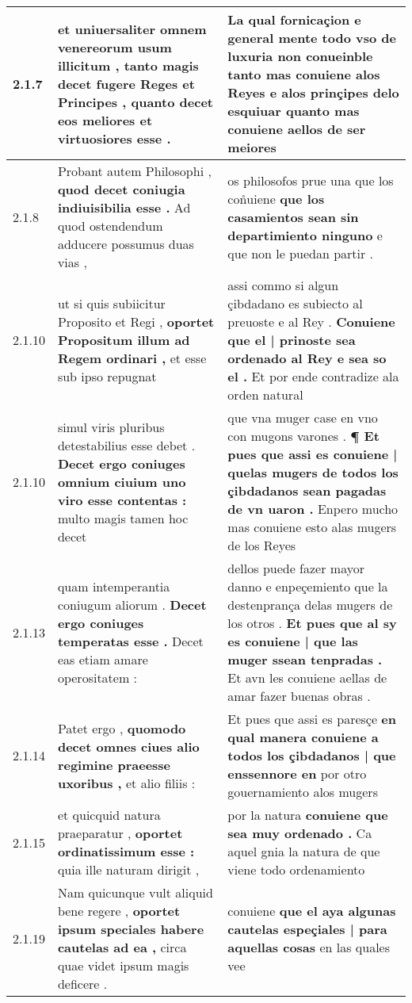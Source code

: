 \begin{tabular}{|p{1cm}|p{6.5cm}|p{6.5cm}|}
2.1.7 & et uniuersaliter omnem venereorum usum illicitum , \textbf{ tanto magis decet fugere Reges et Principes , } quanto decet eos meliores et virtuosiores esse . & La qual fornicaçion e general mente todo vso de luxuria non conueinble tanto \textbf{ mas conuiene alos Reyes } e alos prinçipes delo esquiuar quanto mas conuiene aellos de ser meiores \\\hline
2.1.8 & Probant autem Philosophi , \textbf{ quod decet coniugia indiuisibilia esse . } Ad quod ostendendum adducere possumus duas vias , & os philosofos prue una que los con̊uiene \textbf{ que los casamientos sean sin departimiento ninguno } e que non le puedan partir . \\\hline
2.1.10 & ut si quis subiicitur Proposito et Regi , \textbf{ oportet Propositum illum ad Regem ordinari , } et esse sub ipso repugnat & assi commo si algun çibdadano es subiecto al preuoste e al Rey . \textbf{ Conuiene que el | prinoste sea ordenado al Rey e sea so el . } Et por ende contradize ala orden natural \\\hline
2.1.10 & simul viris pluribus detestabilius esse debet . \textbf{ Decet ergo coniuges omnium ciuium uno viro esse contentas : } multo magis tamen hoc decet & que vna muger case en vno con mugons varones . \textbf{ ¶ Et pues que assi es conuiene | quelas mugers de todos los çibdadanos sean pagadas de vn uaron . } Enpero mucho mas conuiene esto alas mugers de los Reyes \\\hline
2.1.13 & quam intemperantia coniugum aliorum . \textbf{ Decet ergo coniuges temperatas esse . } Decet eas etiam amare operositatem : & dellos puede fazer mayor danno e enpeçemiento que la destenprança delas mugers de los otros . \textbf{ Et pues que al sy es conuiene | que las muger ssean tenpradas . } Et avn les conuiene aellas de amar fazer buenas obras . \\\hline
2.1.14 & Patet ergo , \textbf{ quomodo decet omnes ciues alio regimine praeesse uxoribus , } et alio filiis : & Et pues que assi es paresçe \textbf{ en qual manera conuiene a todos los çibdadanos | que enssennore en } por otro gouernamiento alos mugers \\\hline
2.1.15 & et quicquid natura praeparatur , \textbf{ oportet ordinatissimum esse : } quia ille naturam dirigit , & por la natura \textbf{ conuiene que sea muy ordenado . } Ca aquel gnia la natura de que viene todo ordenamiento \\\hline
2.1.19 & Nam quicunque vult aliquid bene regere , \textbf{ oportet ipsum speciales habere cautelas ad ea , } circa quae videt ipsum magis deficere . & conuiene \textbf{ que el aya algunas cautelas espeçiales | para aquellas cosas } en las quales vee \\\hline

\end{tabular}
